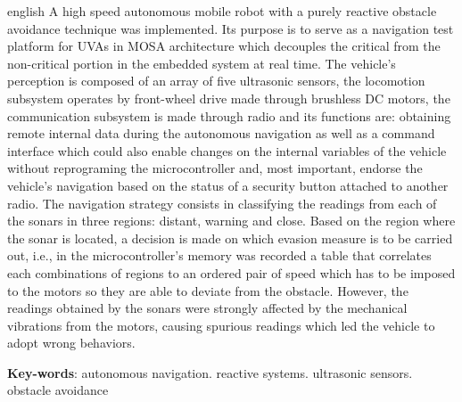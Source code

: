 \begin{resumo}[Abstract]
  \begin{otherlanguage*}{english}
 A high speed autonomous mobile robot with a purely reactive obstacle avoidance technique was implemented. Its purpose is to serve as a navigation 
test platform for UVAs in MOSA architecture which decouples the critical from the non-critical portion in the embedded system at real time. The 
vehicle’s perception is composed of an array of five ultrasonic sensors, the locomotion subsystem operates by front-wheel drive made through brushless 
DC motors, the communication subsystem is made through radio and its functions are: obtaining remote internal data during the autonomous navigation as 
well as a command interface which could also enable changes on the internal variables of the vehicle without reprograming the microcontroller and, 
most important, endorse the vehicle’s navigation based on the status of a security button attached to another radio. The navigation strategy consists 
in classifying the readings from each of the sonars in three regions: distant, warning and close. Based on the region where the sonar is located, a 
decision is made on which evasion measure is to be carried out, i.e., in the microcontroller’s memory was recorded a table that correlates each 
combinations of regions to an ordered pair of speed which has to be imposed to the motors so they are able to deviate from the obstacle. However, the 
readings obtained by the sonars were strongly affected by the mechanical vibrations from the motors, causing spurious readings which led the vehicle 
to adopt wrong behaviors.

    \vspace{\onelineskip}
  
    \noindent 
    \textbf{Key-words}: autonomous navigation. reactive systems. ultrasonic sensors. obstacle avoidance
  \end{otherlanguage*}
 \end{resumo}
